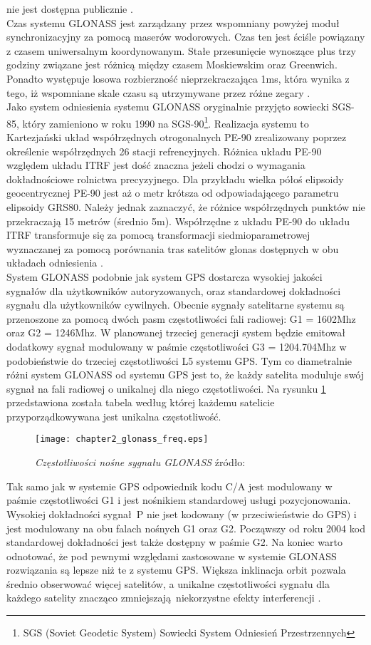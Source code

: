 nie jest dostępna publicznie \cite[][strona 353]{hofmann_gnss}.\\
\indent Czas systemu GLONASS jest zarządzany przez wspomniany powyżej moduł synchronizacyjny za pomocą maserów wodorowych. Czas ten jest ściśle powiązany z czasem uniwersalnym 
koordynowanym. Stałe przesunięcie wynoszące plus trzy godziny związane jest różnicą między czasem Moskiewskim oraz Greenwich. Ponadto występuje losowa 
rozbierzność nieprzekraczająca 1ms, która wynika z tego, iż wspomniane skale czasu są utrzymywane przez różne zegary \cite[][strona 346]{hofmann_gnss}.\\
\indent Jako system odniesienia systemu GLONASS oryginalnie przyjęto sowiecki SGS-85, który zamieniono w roku 1990 na SGS-90\footnote{ SGS (Soviet Geodetic System) Sowiecki 
System Odniesień Przestrzennych}. Realizacja systemu to Kartezjański układ współrzędnych otrogonalnych PE-90 zrealizowany poprzez określenie współrzędnych 26 stacji 
refrencyjnych. Różnica układu PE-90 względem układu ITRF jest dość znaczna jeżeli chodzi o wymagania dokładnościowe rolnictwa precyzyjnego.
Dla przykładu wielka półoś elipsoidy geocentrycznej PE-90 jest aż o metr krótsza od odpowiadającego parametru elipsoidy GRS80. Należy jednak zaznaczyć, że 
różnice współrzędnych punktów nie przekraczają 15 metrów (średnio 5m).
Współrzędne z układu PE-90 do układu ITRF transformuje się za pomocą transformacji siedmioparametrowej wyznaczanej za
pomocą porównania tras satelitów glonas dostępnych w obu układach odniesienia \cite[]{wgs84_pe90}.\\
\indent System GLONASS podobnie jak system GPS dostarcza wysokiej jakości sygnałów dla użytkowników autoryzowanych, oraz standardowej dokładności sygnału 
dla użytkowników cywilnych. Obecnie sygnały satelitarne systemu są przenoszone za pomocą dwóch pasm częstotliwości fali radiowej: G1 = 1602Mhz oraz G2 = 1246Mhz.
W planowanej trzeciej generacji system będzie emitował dodatkowy sygnał modulowany w paśmie częstotliwości G3 = 1204.704Mhz w podobieństwie do trzeciej częstotliwości L5 
systemu GPS. Tym co diametralnie różni system GLONASS od systemu GPS jest to, że każdy satelita moduluje swój sygnał na fali radiowej o unikalnej dla niego częstotliwości.
Na rysunku \ref{fig:glonas_freq} przedstawiona została tabela według której każdemu satelicie przyporządkowywana jest unikalna częstotliwość.
\begin{figure}[H]
\centering
\texttt{[image: chapter2\_glonass\_freq.eps]}
\caption{\textit{Częstotliwości nośne sygnału GLONASS} źródło: \cite[][strona 357]{hofmann_gnss}}
\label{fig:glonas_freq}
\end{figure}
Tak samo jak w systemie GPS odpowiednik kodu C/A jest modulowany w paśmie częstotliwości G1 i jest nośnikiem standardowej usługi pozycjonowania.
Wysokiej dokładności sygnał P nie jset kodowany (w przeciwieństwie do GPS) i jest modulowany na obu falach nośnych G1 oraz G2. Począwszy od roku 2004 
kod standardowej dokładności jest także dostępny w paśmie G2. Na koniec warto odnotować, że pod pewnymi względami zastosowane w systemie GLONASS rozwiązania 
są lepsze niż te z systemu GPS. Większa inklinacja orbit pozwala średnio obserwować więcej satelitów, a unikalne częstotliwości sygnału dla każdego satelity 
znacząco zmniejszają niekorzystne efekty interferencji \cite[][strona 355]{hofmann_gnss}.
